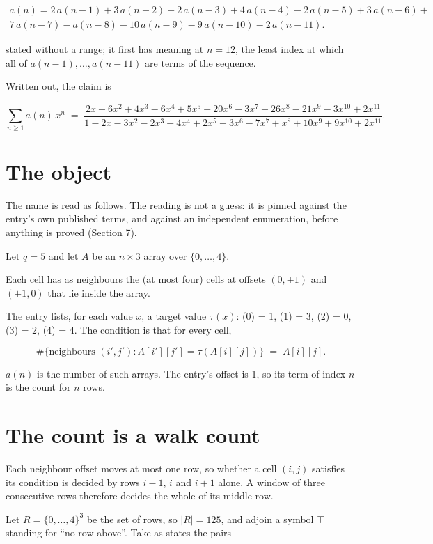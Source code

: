 \documentclass[11pt]{article}
\theoremstyle{definition}
\begin{document}
\begin{multline*} a(n) = 2\,a(n-1) + 3\,a(n-2) + 2\,a(n-3) + 4\,a(n-4) - 2\,a(n-5) + 3\,a(n-6) + \\ 7\,a(n-7) - a(n-8) - 10\,a(n-9) - 9\,a(n-10) - 2\,a(n-11). \end{multline*}

stated without a range; it first has meaning at $n = 12$, the least index at which all of $a(n-1),\dots,a(n-11)$ are terms of the sequence.

Written out, the claim is

\[\sum_{n \ge 1} a(n)\,x^n \;=\; \frac{2x + 6x^{2} + 4x^{3} - 6x^{4} + 5x^{5} + 20x^{6} - 3x^{7} - 26x^{8} - 21x^{9} - 3x^{10} + 2x^{11}}{1 - 2x - 3x^{2} - 2x^{3} - 4x^{4} + 2x^{5} - 3x^{6} - 7x^{7} + x^{8} + 10x^{9} + 9x^{10} + 2x^{11}}.\]

\section{The object}

The name is read as follows. The reading is not a guess: it is pinned against the entry's own published terms, and against an independent enumeration, before anything is proved (Section 7).

Let $q = 5$ and let $A$ be an $n \times 3$ array over $\{0,\dots,4\}$.

Each cell has as neighbours the (at most four) cells at offsets $(0,\pm1)$ and $(\pm1,0)$ that lie inside the array.

The entry lists, for each value $x$, a target value $\tau(x)$: \tau(0) = 1, \tau(1) = 3, \tau(2) = 0, \tau(3) = 2, \tau(4) = 4. The condition is that for every cell,

\[\#\{\text{neighbours } (i',j') : A[i'][j'] = \tau(A[i][j])\} \;=\; A[i][j].\]

$a(n)$ is the number of such arrays. The entry's offset is 1, so its term of index $n$ is the count for $n$ rows.

\section{The count is a walk count}

Each neighbour offset moves at most one row, so whether a cell $(i,j)$ satisfies its condition is decided by rows $i-1$, $i$ and $i+1$ alone. A window of three consecutive rows therefore decides the whole of its middle row.

Let $R = \{0,\dots,4\}^{3}$ be the set of rows, so $|R| = 125$, and adjoin a symbol $\top$ standing for ``no row above''. Take as states the pairs
\end{document}

